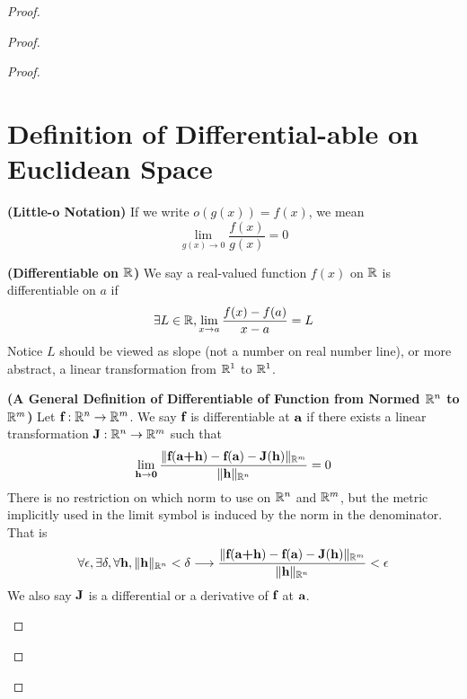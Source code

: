 \documentclass{report}
\begin{document}
\begin{proof}
\begin{proof}
\begin{proof}
\section{Definition of Differential-able on Euclidean Space} 
\begin{definition}
\label{6.2.1}
\textbf{(Little-o Notation)} If we write $o(g(x))=f(x)$, we mean
\begin{equation}
\lim_{g(x)\to 0}\frac{f(x)}{g(x)}=0
\end{equation}
\end{definition}
\begin{definition}
\label{6.2.2}
\textbf{(Differentiable on $\mathbb{R}$)} We say a real-valued function $f(x)$ on $\mathbb{R}$ is differentiable on $a$ if 
\begin{equation}
\exists L\in \mathbb{R}, \lim_{x \to a}\frac{f(x)-f(a)}{x-a}=L
\end{equation}
Notice $L$ should be viewed as slope (not a number on real number line), or more abstract, a linear transformation from $\mathbb{R}^1$ to  $\mathbb{R}^1$. 
\end{definition}
\begin{definition}
\label{6.2.3}
\textbf{(A General Definition of Differentiable of Function from Normed $\mathbb{R}^n$ to $\mathbb{R}^m$)} Let $\textbf{f}:\mathbb{R}^n\rightarrow \mathbb{R}^m$. We say $\textbf{f}$ is differentiable at $\textbf{a}$ if there exists a linear transformation $\textbf{J}:\mathbb{R}^n\rightarrow \mathbb{R}^m$ such that
\begin{equation}
\lim_{\textbf{h}\to \textbf{0}}\frac{\| \textbf{f}(\textbf{a+h})-\textbf{f}(\textbf{a})-\textbf{J}(\textbf{h}) \|_{\mathbb{R}^m}}{\| \textbf{h} \|_{\mathbb{R}^n}}=0
\end{equation}
There is no restriction on which norm to use on $\mathbb{R}^n$ and $\mathbb{R}^m$, but the metric implicitly used in the limit symbol is induced by the norm in the denominator. That is
\begin{equation}
\forall \epsilon, \exists \delta, \forall \textbf{h},\| \textbf{h} \|_{\mathbb{R}^n}<\delta \longrightarrow \frac{\| \textbf{f}(\textbf{a+h})-\textbf{f}(\textbf{a})-\textbf{J}(\textbf{h}) \|_{\mathbb{R}^m}}{\| \textbf{h} \|_{\mathbb{R}^n}}<\epsilon
\end{equation}
We also say $\textbf{J}$ is a differential or a derivative of $\textbf{f}$ at $\textbf{a}$.
\end{definition}


\end{proof}
\end{proof}
\end{proof}
\end{document}
